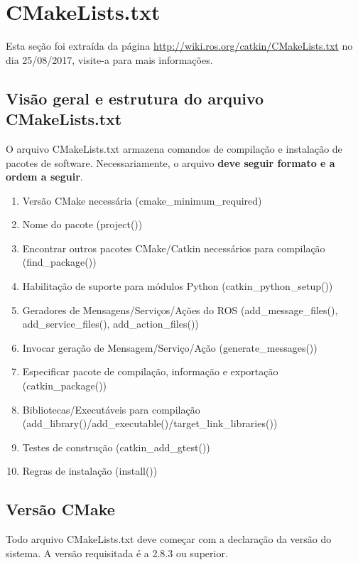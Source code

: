 


\chapter{CMakeLists.txt}
\label{cmake}

Esta seção foi extraída da página \url{http://wiki.ros.org/catkin/CMakeLists.txt} no dia 25/08/2017, visite-a para mais informações.

\section{Visão geral e estrutura do arquivo CMakeLists.txt}

O arquivo CMakeLists.txt armazena comandos de compilação e instalação de pacotes de software. Necessariamente, o arquivo \textbf{deve seguir formato e a ordem a seguir}. 

\begin{enumerate}
	\setlength{\itemsep}{1pt}
	\setlength{\parskip}{0pt}
	\setlength{\parsep}{0pt}
	\item Versão CMake necessária (cmake\_minimum\_required)
	\item Nome do pacote (project())
	\item Encontrar outros pacotes CMake/Catkin necessários para compilação (find\_package())
	\item Habilitação de suporte para módulos Python (catkin\_python\_setup())
	\item Geradores de Mensagens/Serviços/Ações do ROS (add\_message\_files(), add\_service\_files(), add\_action\_files())
	\item Invocar geração de Mensagem/Serviço/Ação (generate\_messages())
	\item Especificar pacote  de compilação, informação e exportação (catkin\_package())
	\item Bibliotecas/Executáveis para compilação (add\_library()/add\_executable()/target\_link\_libraries())
	\item Testes de construção (catkin\_add\_gtest())
	\item Regras de instalação (install())	
\end{enumerate}

\section{Versão CMake}

Todo arquivo CMakeLists.txt deve começar com a declaração da versão do sistema. A versão requisitada é a 2.8.3 ou superior.

